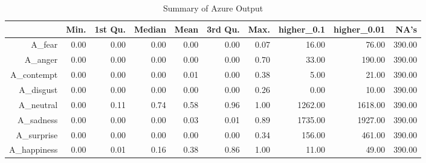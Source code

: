 \begin{table}[ht]
\centering
\begin{tabular}{rrrrrrrrrr}
  \hline
 & Min.    & 1st Qu. & Median  & Mean    & 3rd Qu. & Max.    & higher\_0.1 & higher\_0.01 & NA's    \\ 
  \hline
    A\_fear & 0.00 & 0.00 & 0.00 & 0.00 & 0.00 & 0.07 & 16.00 & 76.00 & 390.00 \\ 
     A\_anger & 0.00 & 0.00 & 0.00 & 0.00 & 0.00 & 0.70 & 33.00 & 190.00 & 390.00 \\ 
    A\_contempt & 0.00 & 0.00 & 0.00 & 0.01 & 0.00 & 0.38 & 5.00 & 21.00 & 390.00 \\ 
    A\_disgust & 0.00 & 0.00 & 0.00 & 0.00 & 0.00 & 0.26 & 0.00 & 10.00 & 390.00 \\ 
    A\_neutral & 0.00 & 0.11 & 0.74 & 0.58 & 0.96 & 1.00 & 1262.00 & 1618.00 & 390.00 \\ 
    A\_sadness & 0.00 & 0.00 & 0.00 & 0.03 & 0.01 & 0.89 & 1735.00 & 1927.00 & 390.00 \\ 
    A\_surprise & 0.00 & 0.00 & 0.00 & 0.00 & 0.00 & 0.34 & 156.00 & 461.00 & 390.00 \\ 
   A\_happiness & 0.00 & 0.01 & 0.16 & 0.38 & 0.86 & 1.00 & 11.00 & 49.00 & 390.00 \\ 
   \hline
\end{tabular}
\caption{Summary of Azure Output} 
\label{Tab:Img_Azure}
\end{table}
